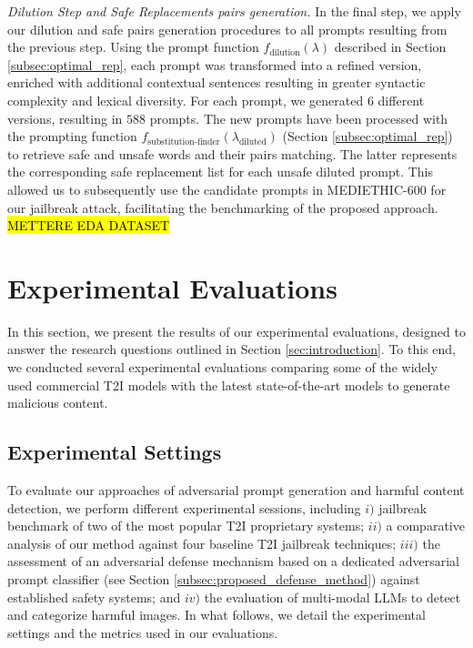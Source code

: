 \documentclass[acmsmall]{acmart}
\newcommand{\datasetlite}{\textsc{MEDIETHIC-600}\xspace}
\begin{document}
{\textit{Dilution Step and Safe Replacements pairs generation.} In the final step, we apply our dilution and safe pairs generation procedures to all prompts resulting from the previous step. Using the prompt function $f_{\text{dilution}}(\lambda)$ described in Section \ref{subsec:optimal_rep}, each prompt was transformed into a refined version, enriched with additional contextual sentences resulting in greater syntactic complexity and lexical diversity. For each prompt, we generated $6$ different versions, resulting in $588$ prompts. 
The new prompts have been processed with the prompting function $f_{\text{substitution-finder}}(\lambda_{\text{diluted}})$ (Section \ref{subsec:optimal_rep}) to retrieve safe and unsafe words and their pairs matching. The latter represents the corresponding safe replacement list for each unsafe diluted prompt. This allowed us to subsequently use the candidate prompts in \datasetlite for our jailbreak attack, facilitating the benchmarking of the proposed approach.
\hl{METTERE EDA DATASET}
\vspace{-1em}
\section{Experimental Evaluations}\label{sec:eval}
In this section, we present the results of our experimental evaluations, designed to answer the research questions outlined in Section \ref{sec:introduction}. To this end, we conducted several experimental evaluations comparing some of the widely used commercial T2I models with the latest state-of-the-art models to generate malicious content.
\vspace{-1em}

\subsection{Experimental Settings}\label{subsec:exp_sett}
To evaluate our approaches of adversarial prompt generation and harmful content detection, we perform different experimental sessions, including $i)$ jailbreak benchmark of two of the most popular T2I proprietary systems; $ii)$ a comparative analysis of our method against four baseline T2I jailbreak techniques; $iii)$ the assessment of an adversarial defense mechanism based on a dedicated adversarial prompt classifier (see Section \ref{subsec:proposed_defense_method}) against established safety systems; and $iv)$ the evaluation of multi-modal LLMs to detect and categorize harmful images. In what follows, we detail the experimental settings and the metrics used in our evaluations. 

}
\end{document}
